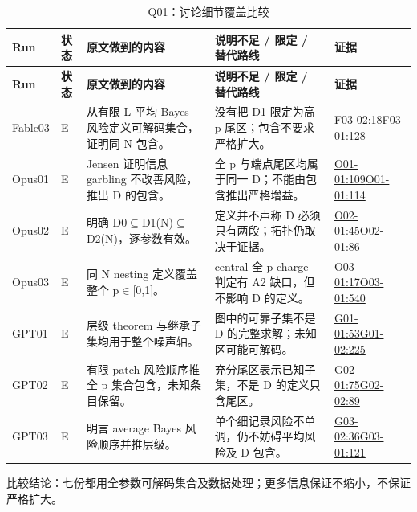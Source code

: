\documentclass[11pt,a4paper]{article}
\begin{document}
{\fontsize{9.0}{12.6}\selectfont
\setlength{\tabcolsep}{2.5pt}
\begin{longtable}{>{\raggedright\arraybackslash}p{}>{\raggedright\arraybackslash}p{}>{\raggedright\arraybackslash}p{}>{\raggedright\arraybackslash}p{}>{\raggedright\arraybackslash}p{}}
\caption{Q01：讨论细节覆盖比较}\\
\toprule
\textbf{Run} & \textbf{状态} & \textbf{原文做到的内容} & \textbf{说明不足 / 限定 / 替代路线} & \textbf{证据}\tabularnewline
\midrule
\endfirsthead
\toprule
\textbf{Run} & \textbf{状态} & \textbf{原文做到的内容} & \textbf{说明不足 / 限定 / 替代路线} & \textbf{证据}\tabularnewline
\midrule
\endhead
{}Fable03 & E & 从有限 L 平均 Bayes 风险定义可解码集合，证明同 N 包含。 & 没有把 D1 限定为高 p 尾区；包含不要求严格扩大。 & \hyperref[src:F03-02]{F03-02:18}\newline \hyperref[src:F03-01]{F03-01:128}\tabularnewline
{}Opus01 & E & Jensen 证明信息 garbling 不改善风险，推出 D 的包含。 & 全 p 与端点尾区均属于同一 D；不能由包含推出严格增益。 & \hyperref[src:O01-01]{O01-01:109}\newline \hyperref[src:O01-01]{O01-01:114}\tabularnewline
{}Opus02 & E & 明确 D0\ensuremath{\subseteq}D1(N)\ensuremath{\subseteq}D2(N)，逐参数有效。 & 定义并不声称 D 必须只有两段；拓扑仍取决于证据。 & \hyperref[src:O02-01]{O02-01:45}\newline \hyperref[src:O02-01]{O02-01:86}\tabularnewline
{}Opus03 & E & 同 N nesting 定义覆盖整个 p\ensuremath{\in}[0,1]。 & central 全 p charge 判定有 A2 缺口，但不影响 D 的定义。 & \hyperref[src:O03-01]{O03-01:17}\newline \hyperref[src:O03-01]{O03-01:540}\tabularnewline
{}GPT01 & E & 层级 theorem 与继承子集均用于整个噪声轴。 & 图中的可靠子集不是 D 的完整求解；未知区可能可解码。 & \hyperref[src:G01-01]{G01-01:53}\newline \hyperref[src:G01-02]{G01-02:225}\tabularnewline
{}GPT02 & E & 有限 patch 风险顺序推全 p 集合包含，未知条目保留。 & 充分尾区表示已知子集，不是 D 的定义只含尾区。 & \hyperref[src:G02-01]{G02-01:75}\newline \hyperref[src:G02-02]{G02-02:89}\tabularnewline
{}GPT03 & E & 明言 average Bayes 风险顺序并推层级。 & 单个细记录风险不单调，仍不妨碍平均风险及 D 包含。 & \hyperref[src:G03-02]{G03-02:36}\newline \hyperref[src:G03-01]{G03-01:121}\tabularnewline
\bottomrule
\end{longtable}
}
比较结论：七份都用全参数可解码集合及数据处理；更多信息保证不缩小，不保证严格扩大。
\end{document}
